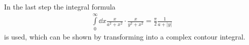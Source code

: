 %
In the last step the integral formula
%
\begin{align}
	\int\limits_{0}^{\infty} \dd{x} \frac{x}{a^{2} + x^{2}} \cdot \frac{x}{y^{2} + x^{2}} = \frac{\pi}{2} \frac{1}{a + |y|}
\end{align}
%
is used, which can be shown by transforming into a complex contour integral.


















%
%



